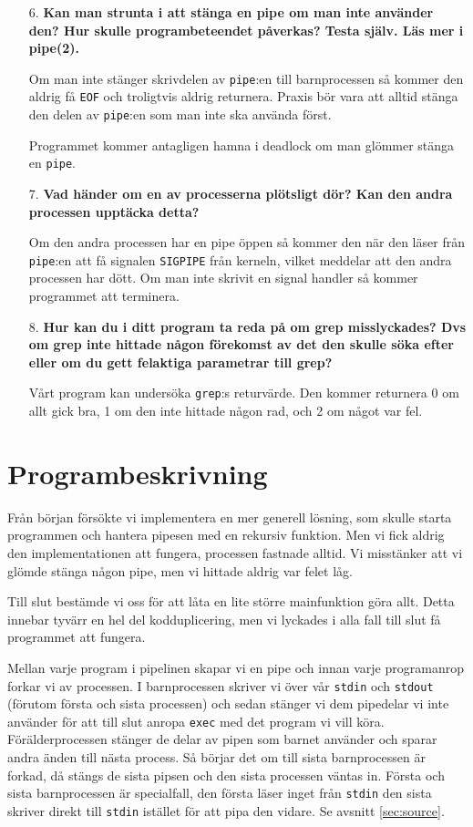 \documentclass[a4paper,10pt,titlepage]{article}
\begin{document}
\begin{enumerate}
	\item[6.] \textbf{\footnotesize Kan man strunta i att stänga en pipe om man inte använder den? Hur skulle programbeteendet påverkas? Testa själv. Läs mer i pipe(2).}

	Om man inte stänger skrivdelen av \verb!pipe!:en till barnprocessen så kommer den aldrig få \verb!EOF! och troligtvis aldrig returnera. Praxis bör vara att alltid stänga den delen av \verb!pipe!:en som man inte ska använda först.

	Programmet kommer antagligen hamna i deadlock om man glömmer stänga en \verb!pipe!.

	\item[7.] \textbf{\footnotesize Vad händer om en av processerna plötsligt dör? Kan den andra processen upptäcka detta?}

	Om den andra processen har en pipe öppen så kommer den när den läser från \verb!pipe!:en att få signalen \verb!SIGPIPE! från kerneln, vilket meddelar att den andra processen har dött. Om man inte skrivit en signal handler så kommer programmet att terminera.

	\item[8.] \textbf{\footnotesize Hur kan du i ditt program ta reda på om grep misslyckades? Dvs om grep inte hittade någon förekomst av det den skulle söka efter eller om du gett felaktiga parametrar till grep?}

	Vårt program kan undersöka \verb!grep!:s returvärde. Den kommer returnera 0 om allt gick bra, 1 om den inte hittade någon rad, och 2 om något var fel.	
\end{enumerate}

\newpage
\section{Programbeskrivning}

Från början försökte vi implementera en mer generell lösning, som skulle starta programmen
och hantera pipesen med en rekursiv funktion. Men vi fick aldrig den
implementationen att fungera, processen fastnade alltid. Vi misstänker att vi
glömde stänga någon pipe, men vi hittade aldrig var felet låg.

Till slut bestämde vi oss för att låta en lite större mainfunktion göra allt.
Detta innebar tyvärr en hel del kodduplicering, men vi lyckades i alla fall till
slut få programmet att fungera.

Mellan varje program i pipelinen skapar vi en pipe och innan varje programanrop
forkar vi av processen. I barnprocessen skriver vi över vår \verb!stdin! och
\verb!stdout! (förutom första och sista processen) och sedan stänger vi dem pipedelar
vi inte använder för att till slut anropa \verb!exec! med det program vi
vill köra. Förälderprocessen stänger de delar av pipen som barnet använder och
sparar andra änden till nästa process. Så börjar det om till sista
barnprocessen är forkad, då stängs de sista pipsen och den sista processen
väntas in. Första och sista barnprocessen är
specialfall, den första läser inget från \verb!stdin! den sista skriver direkt
till \verb!stdin! istället för att pipa den vidare. Se avsnitt \ref{sec:source}.
\end{document}
